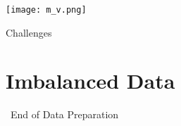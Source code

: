 \documentclass[serif, aspectratio=169]{beamer}
\begin{document}
\begin{frame}
    \centering
    \texttt{[image: m\_v.png]}
\end{frame}

\begin{frame}{Challenges}
    \begin{itemize}
        
    \end{itemize}
\end{frame}

\section{Imbalanced Data}


\begin{frame}
    \begin{center}
        {\Huge\ End of Data Preparation}
    \end{center}
\end{frame}
\end{document}
